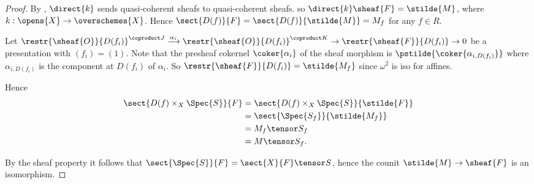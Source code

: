 \begin{proof}
By , $\direct{k}$ sends quasi-coherent sheafs to quasi-coherent sheafs.
so $\direct{k}\sheaf{F} = \stilde{M}$,
where $k:\opens{X} \rightarrow \overschemes{X}$.
Hence $\sect{D(f)}{F} = \sect{D(f)}{\stilde{M}} = M_f$ 
for any $f\in R$.

Let 
$\restr{\sheaf{O}}{D(f_i)}^{\coproduct J} \xrightarrow{\alpha_i} \restr{\sheaf{O}}{D(f_i)}^{\coproduct K} \rightarrow \restr{\sheaf{F}}{D(f_i)} \rightarrow 0$ be a presentation with $(f_i) = (1)$.
Note that the presheaf cokernel $\coker{\alpha_i}$ of the sheaf morphism is
$\pstilde{\coker{\alpha_{i,D(f_i)}}}$ where $\alpha_{i,D(f_i)}$ is the component at $D(f_i)$ of $\alpha_i$.
So $\restr{\sheaf{F}}{D(f_i)} = \stilde{M_f}$ since $\omega^2$ is iso for affines.

Hence 
\begin{align*}
\sect{D(f) \times_X \Spec{S}}{F} &= \sect{D(f) \times_X \Spec{S}}{\stilde{F}}\\
&= \sect{\Spec{S_f}}{\stilde{M_f}} \\ 
&= M_f \tensor S_f\\
& = M \tensor S_f.
\end{align*}

By the sheaf property it follows that $\sect{\Spec{S}}{F} = \sect{X}{F} \tensor S$,
hence the counit $\stilde{M} \rightarrow \sheaf{F}$ is an isomorphism.
\end{proof}